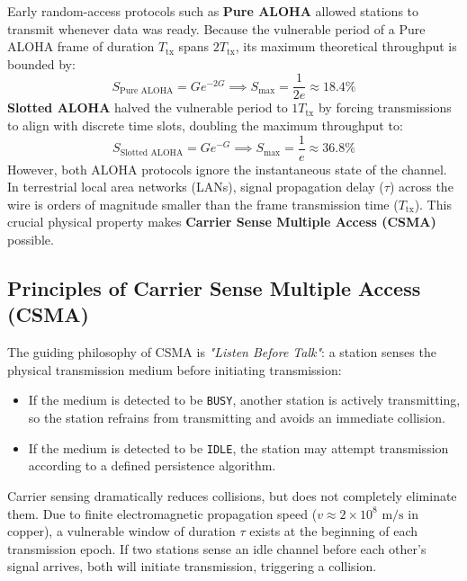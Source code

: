 \documentclass[11pt,a4paper]{article}
\begin{document}
Early random-access protocols such as \textbf{Pure ALOHA} allowed stations to transmit whenever data was ready. Because the vulnerable period of a Pure ALOHA frame of duration $T_{\text{tx}}$ spans $2 T_{\text{tx}}$, its maximum theoretical throughput is bounded by:
\begin{equation}
    S_{\text{Pure ALOHA}} = G e^{-2G} \implies S_{\max} = \frac{1}{2e} \approx 18.4\%
\end{equation}
\textbf{Slotted ALOHA} halved the vulnerable period to $1 T_{\text{tx}}$ by forcing transmissions to align with discrete time slots, doubling the maximum throughput to:
\begin{equation}
    S_{\text{Slotted ALOHA}} = G e^{-G} \implies S_{\max} = \frac{1}{e} \approx 36.8\%
\end{equation}
However, both ALOHA protocols ignore the instantaneous state of the channel. In terrestrial local area networks (LANs), signal propagation delay ($\tau$) across the wire is orders of magnitude smaller than the frame transmission time ($T_{\text{tx}}$). This crucial physical property makes \textbf{Carrier Sense Multiple Access (CSMA)} possible.

\subsection{Principles of Carrier Sense Multiple Access (CSMA)}
The guiding philosophy of CSMA is \textit{"Listen Before Talk"}: a station senses the physical transmission medium before initiating transmission:
\begin{itemize}
    \item If the medium is detected to be \texttt{BUSY}, another station is actively transmitting, so the station refrains from transmitting and avoids an immediate collision.
    \item If the medium is detected to be \texttt{IDLE}, the station may attempt transmission according to a defined persistence algorithm.
\end{itemize}
Carrier sensing dramatically reduces collisions, but does not completely eliminate them. Due to finite electromagnetic propagation speed ($v \approx 2 \times 10^8\text{ m/s}$ in copper), a vulnerable window of duration $\tau$ exists at the beginning of each transmission epoch. If two stations sense an idle channel before each other's signal arrives, both will initiate transmission, triggering a collision.
\end{document}
